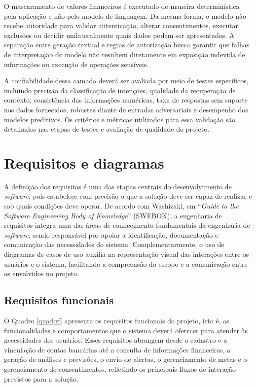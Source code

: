 O mascaramento de valores financeiros é executado de maneira determinística pela aplicação e não pelo modelo de linguagem. Da mesma forma, o modelo não recebe autoridade para validar autenticação, alterar consentimentos, executar exclusões ou decidir unilateralmente quais dados podem ser apresentados. A separação entre geração textual e regras de autorização busca garantir que falhas de interpretação do modelo não resultem diretamente em exposição indevida de informações ou execução de operações sensíveis.

A confiabilidade dessa camada deverá ser avaliada por meio de testes específicos, incluindo precisão da classificação de intenções, qualidade da recuperação de contexto, consistência das informações numéricas, taxa de respostas sem suporte nos dados fornecidos, robustez diante de entradas adversariais e desempenho dos modelos preditivos. Os critérios e métricas utilizados para essa validação são detalhados nas etapas de testes e avaliação de qualidade do projeto.


    \section{Requisitos e diagramas}

    A definição dos requisitos é uma das etapas centrais do desenvolvimento de \textit{software}, pois estabelece com precisão o que a solução deve ser capaz de realizar e sob quais condições deve operar. De acordo com Washizaki, em ``\textit{Guide to the Software Engineering Body of Knowledge}'' (SWEBOK), a engenharia de requisitos integra uma das áreas de conhecimento fundamentais da engenharia de \textit{software}, sendo responsável por apoiar a identificação, documentação e comunicação das necessidades do sistema. Complementarmente, o uso de diagramas de casos de uso auxilia na representação visual das interações entre os usuários e o sistema, facilitando a compreensão do escopo e a comunicação entre os envolvidos no projeto.

    \subsection{Requisitos funcionais}

    O Quadro \ref{quad:rf} apresenta os requisitos funcionais do projeto, isto é, as funcionalidades e comportamentos que o sistema deverá oferecer para atender às necessidades dos usuários. Esses requisitos abrangem desde o cadastro e a vinculação de contas bancárias até a consulta de informações financeiras, a geração de análises e previsões, o envio de alertas, o gerenciamento de metas e o gerenciamento de consentimentos, refletindo os principais fluxos de interação previstos para a solução.

